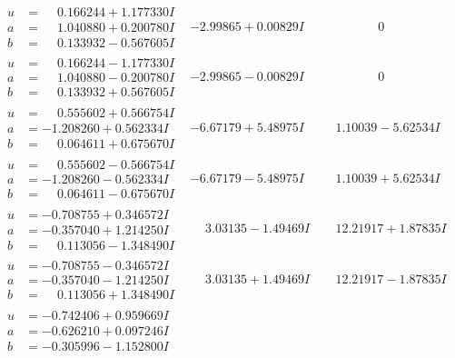 \documentclass[1p]{elsarticle_modified}
\theoremstyle{definition}
\begin{document}
$$\begin{array}{c|c|c}
\begin{aligned}
u &= \phantom{-}0.166244 + 1.177330 I \\
a &= \phantom{-}1.040880 + 0.200780 I \\
b &= \phantom{-}0.133932 - 0.567605 I\end{aligned}
 & -2.99865 + 0.00829 I & \phantom{-0.000000 } 0 \\ \hline\begin{aligned}
u &= \phantom{-}0.166244 - 1.177330 I \\
a &= \phantom{-}1.040880 - 0.200780 I \\
b &= \phantom{-}0.133932 + 0.567605 I\end{aligned}
 & -2.99865 - 0.00829 I & \phantom{-0.000000 } 0 \\ \hline\begin{aligned}
u &= \phantom{-}0.555602 + 0.566754 I \\
a &= -1.208260 + 0.562334 I \\
b &= \phantom{-}0.064611 + 0.675670 I\end{aligned}
 & -6.67179 + 5.48975 I & \phantom{-}1.10039 - 5.62534 I \\ \hline\begin{aligned}
u &= \phantom{-}0.555602 - 0.566754 I \\
a &= -1.208260 - 0.562334 I \\
b &= \phantom{-}0.064611 - 0.675670 I\end{aligned}
 & -6.67179 - 5.48975 I & \phantom{-}1.10039 + 5.62534 I \\ \hline\begin{aligned}
u &= -0.708755 + 0.346572 I \\
a &= -0.357040 + 1.214250 I \\
b &= \phantom{-}0.113056 - 1.348490 I\end{aligned}
 & \phantom{-}3.03135 - 1.49469 I & \phantom{-}12.21917 + 1.87835 I \\ \hline\begin{aligned}
u &= -0.708755 - 0.346572 I \\
a &= -0.357040 - 1.214250 I \\
b &= \phantom{-}0.113056 + 1.348490 I\end{aligned}
 & \phantom{-}3.03135 + 1.49469 I & \phantom{-}12.21917 - 1.87835 I \\ \hline\begin{aligned}
u &= -0.742406 + 0.959669 I \\
a &= -0.626210 + 0.097246 I \\
b &= -0.305996 - 1.152800 I\end{aligned}

\end{array}$$
\end{document}
